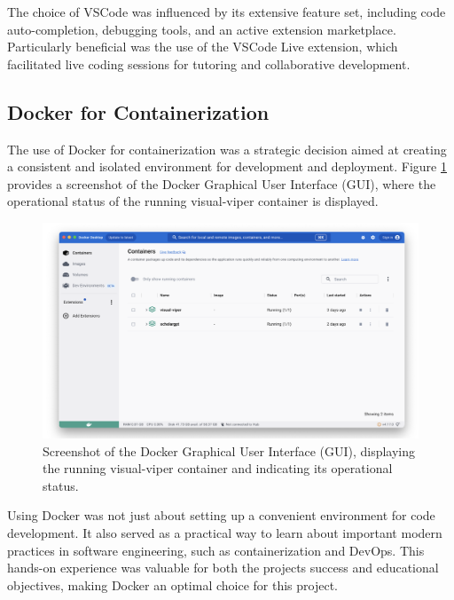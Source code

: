 The choice of VSCode was influenced by its extensive feature set,
including code auto-completion, debugging tools, and an active extension
marketplace. Particularly beneficial was the use of the VSCode Live
extension, which facilitated live coding sessions for tutoring and
collaborative development.

\subsection{Docker for
Containerization}\label{docker-for-containerization}

The use of Docker for containerization was a strategic decision aimed at
creating a consistent and isolated environment for development and
deployment. Figure \ref{fig:docker} provides a screenshot of the Docker Graphical User
Interface (GUI), where the operational status of the running
\textquotesingle visual-viper\textquotesingle{} container is displayed.

\begin{figure}[ht]
  \centering
  \includegraphics[width=\textwidth]{media/fig3.png}
  \caption{Screenshot of the Docker Graphical User Interface (GUI),
  displaying the running \textquotesingle visual-viper\textquotesingle{}
  container and indicating its operational status.}
  \label{fig:docker}
\end{figure}


Using Docker was not just about setting up a convenient environment for
code development. It also served as a practical way to learn about
important modern practices in software engineering, such as
containerization and DevOps. This hands-on experience was valuable for
both the project\textquotesingle s success and educational objectives,
making Docker an optimal choice for this project.

